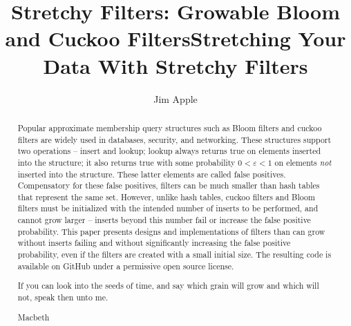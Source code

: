\documentclass[letterpaper,twocolumn,10pt]{article}
\newcommand{\Taffy}{Stretchy}
\newcommand{\Taffy}{Taffy}
\begin{document}
\ifanon
\title{\Taffy{} Filters: Growable Bloom and Cuckoo Filters}
\else
\title{Stretching Your Data With \Taffy{} Filters}
\fi

\ifanon
\else
\author{Jim Apple}
\fi






\maketitle

\begin{abstract}
Popular approximate membership query structures such as Bloom filters and cuckoo filters are widely used in databases, security, and networking.
These structures support two operations -- insert and lookup; lookup always returns true on elements inserted into the structure; it also returns true with some probability $0 < \varepsilon < 1$ on elements {\em not} inserted into the structure.
These latter elements are called false positives.
Compensatory for these false positives, filters can be much smaller than hash tables that represent the same set.
However, unlike hash tables, cuckoo filters and Bloom filters must be initialized with the intended number of inserts to be performed, and cannot grow larger --
inserts beyond this number fail or increase the false positive probability.
This paper presents designs and implementations of filters than can grow without inserts failing and without significantly increasing the false positive probability, even if the filters are created with a small initial size.
The resulting code is available \ifanon\else on GitHub \fi under a permissive open source license.
\ifepigraph
\epigraph{If you can look into the seeds of time, and say which grain will grow and which will not, speak then unto me.}{Macbeth}
\fi
\end{abstract}
\end{document}
